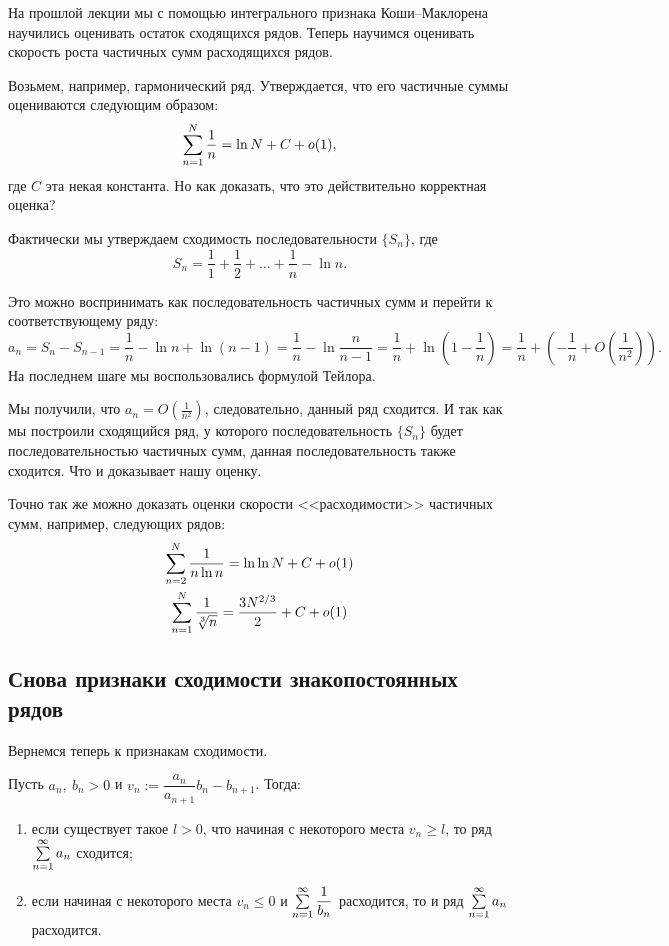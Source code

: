 \documentclass[a4paper, 12pt]{article}
\begin{document}
На прошлой лекции мы с помощью интегрального признака Коши--Маклорена научились оценивать остаток сходящихся рядов. Теперь научимся оценивать скорость роста частичных сумм расходящихся рядов.

Возьмем, например, гармонический ряд. Утверждается, что его частичные суммы оцениваются следующим образом:
$$
\sum\limits_{n=1}^{N} \frac{1}{n} = \ln N + C + o(1),
$$
где $C$ эта некая константа. Но как доказать, что это действительно корректная оценка? 

Фактически мы утверждаем сходимость последовательности $\{S_n\}$, где
$$
S_n = \frac{1}{1} + \frac{1}{2} + \ldots + \frac{1}{n} - \ln n.
$$

Это можно воспринимать как последовательность частичных сумм и перейти к соответствующему ряду:
$$
a_n = S_n - S_{n-1} = \frac{1}{n} - \ln n + \ln(n-1) = \frac{1}{n} - \ln\frac{n}{n-1} = \frac{1}{n} + \ln\left(1 - \frac{1}{n}\right) = \frac{1}{n} + \left( - \frac{1}{n} + O\left(\frac{1}{n^2}\right) \right).
$$
На последнем шаге мы воспользовались формулой Тейлора.

Мы получили, что $a_n = O\left(\frac{1}{n^2}\right)$, следовательно, данный ряд сходится. И так как мы построили сходящийся ряд, у которого последовательность $\{ S_n\}$ будет последовательностью частичных сумм, данная последовательность также сходится. Что и доказывает нашу оценку.

Точно так же можно доказать оценки скорости <<расходимости>> частичных сумм, например, следующих рядов:
\begin{gather*}
\sum\limits_{n=2}^{N} \frac{1}{n\ln n} = \ln \ln N + C + o(1) \\
\sum\limits_{n=1}^{N} \frac{1}{\sqrt[3]{n}} = \frac{3N^{2/3}}{2} + C + o(1) 
\end{gather*}

\subsection{Снова признаки сходимости знакопостоянных рядов}
Вернемся теперь к признакам сходимости. 
\begin{Test}
Пусть $a_n,\ b_n > 0$ и $v_n := \dfrac{a_n}{a_{n+1}}b_n - b_{n+1}$. Тогда:
\begin{enumerate}
\item если существует такое $l > 0$, что начиная с некоторого места $v_n \geq l$, то ряд $\sum\limits_{n=1}^{\infty}a_n$ сходится;
\item если начиная с некоторого места $v_n \leq 0$ и $\sum\limits_{n=1}^{\infty}\dfrac{1}{b_n}$ расходится, то и ряд $\sum\limits_{n=1}^{\infty}a_n$ расходится.
\end{enumerate}
\end{Test}
\end{document}
